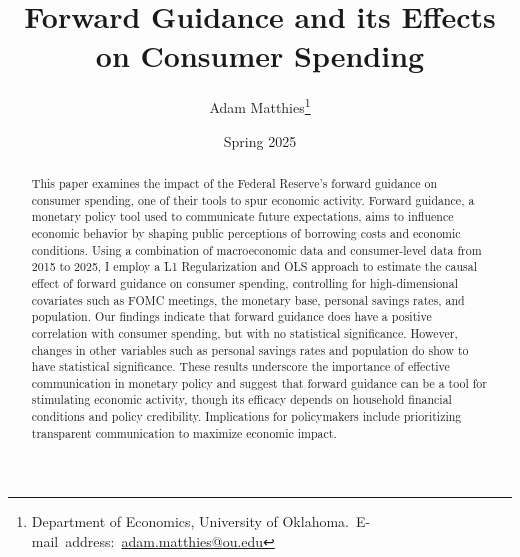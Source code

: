 \documentclass[12pt,english]{article}
\begin{document}
\begin{singlespace}
\title{Forward Guidance and its Effects on Consumer Spending}
\end{singlespace}

\author{Adam Matthies\thanks{Department of Economics, University of Oklahoma.\
E-mail~address:~\href{mailto:student.name@ou.edu}{adam.matthies@ou.edu}}}

\date{Spring 2025}

\maketitle

\begin{abstract}
\begin{singlespace}
This paper examines the impact of the Federal Reserve’s forward guidance on consumer spending, one of their tools to spur economic activity. Forward guidance, a monetary policy tool used to communicate future expectations, aims to influence economic behavior by shaping public perceptions of borrowing costs and economic conditions. Using a combination of macroeconomic data and consumer-level data from 2015 to 2025, I employ a L1 Regularization and OLS approach to estimate the causal effect of forward guidance on consumer spending, controlling for high-dimensional covariates such as FOMC meetings, the monetary base, personal savings rates, and population. Our findings indicate that forward guidance does have a positive correlation with consumer spending, but with no statistical significance. However, changes in other variables such as personal savings rates and population do show to have statistical significance. These results underscore the importance of effective communication in monetary policy and suggest that forward guidance can be a tool for stimulating economic activity, though its efficacy depends on household financial conditions and policy credibility. Implications for policymakers include prioritizing transparent communication to maximize economic impact.
\end{singlespace}

\end{abstract}
\vfill{}


\pagebreak{}
\end{document}
